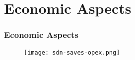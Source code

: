 \section{Economic Aspects}

\begin{frame}[allowframebreaks]
\frametitle{Economic Aspects}

\begin{center}
  \begin{figure}
    \texttt{[image: sdn-saves-opex.png]}
  \end{figure}
\end{center}

\end{frame}

